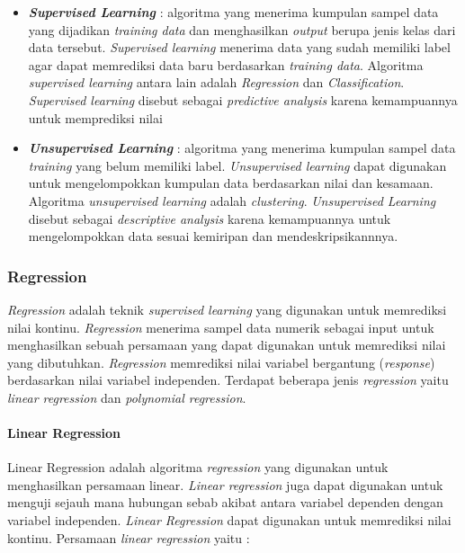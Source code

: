 \documentclass[a4paper,twoside]{article}
\begin{document}
\begin{enumerate}
		\begin{itemize}
			\item \textit{\textbf{Supervised Learning}} : algoritma yang  menerima kumpulan sampel data yang dijadikan \textit{training data} dan menghasilkan \textit{output} berupa jenis kelas dari data tersebut. \textit{Supervised learning} menerima data yang sudah memiliki label agar dapat memrediksi data baru berdasarkan \textit{training data}. Algoritma \textit{supervised learning} antara lain adalah \textit{Regression} dan \textit{Classification}. \textit{Supervised learning}  disebut sebagai \textit{predictive analysis} karena kemampuannya untuk memprediksi nilai 
			
			\item \textit{\textbf{Unsupervised Learning}} : algoritma yang menerima kumpulan sampel data \textit{training} yang belum memiliki label. \textit{Unsupervised learning} dapat digunakan untuk mengelompokkan kumpulan data berdasarkan nilai dan kesamaan. Algoritma \textit{unsupervised learning} adalah \textit{clustering}. \textit{Unsupervised Learning} disebut sebagai \textit{descriptive analysis} karena kemampuannya untuk mengelompokkan data sesuai kemiripan dan mendeskripsikannnya. 
		\end{itemize}		
		
		\subsubsection{Regression} 
 \textit{Regression} adalah  teknik \textit{supervised learning} yang digunakan untuk memrediksi nilai kontinu. \textit{Regression} menerima sampel data numerik sebagai input untuk menghasilkan sebuah persamaan yang dapat digunakan untuk memrediksi nilai yang dibutuhkan. \textit{Regression} memrediksi nilai variabel bergantung (\textit{response}) berdasarkan nilai variabel  independen. Terdapat beberapa jenis \textit{regression} yaitu \textit{linear regression} dan \textit{polynomial regression}.
		
\paragraph{Linear Regression}   
Linear Regression adalah algoritma \textit{regression} yang digunakan untuk menghasilkan persamaan linear. \textit{Linear regression} juga dapat digunakan untuk menguji sejauh mana hubungan sebab akibat antara variabel dependen dengan variabel independen. \textit{Linear Regression} dapat digunakan untuk memrediksi nilai kontinu. Persamaan \textit{linear regression} yaitu : 
		

\end{enumerate}
\end{document}
